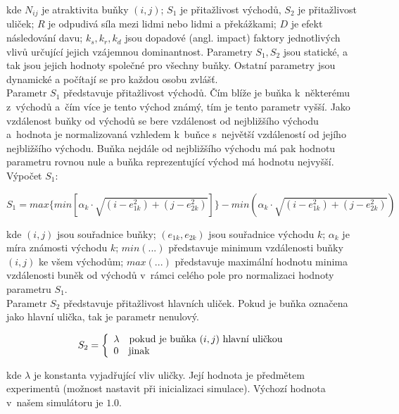 \documentclass[11pt, titlepage, a4paper]{article}
\begin{document}
        kde $N_{ij}$ je atraktivita buňky $(i,j)$; $S_1$ je přitažlivost východů, $S_2$ je přitažlivost uliček; $R$ je odpudivá síla mezi lidmi nebo lidmi a překážkami; $D$ je efekt následování davu; $k_s, k_r, k_d$ jsou dopadové (angl. impact) faktory jednotlivých vlivů určující jejich vzájemnou dominantnost. Parametry $S_1, S_2$ jsou statické, a tak jsou jejich hodnoty společné pro všechny buňky. Ostatní parametry jsou dynamické a počítají se pro každou osobu zvlášť.\\

        Parametr $S_1$ představuje přitažlivost východů. Čím blíže je buňka k~některému z~východů a~čím více je tento východ známý, tím je tento parametr vyšší. Jako vzdálenost buňky od východů se bere vzdálenost od nejbližšího východu a~hodnota je normalizovaná vzhledem k~buňce s~největší vzdáleností od jejího nejbližšího východu. Buňka nejdále od nejbližšího východu má pak hodnotu parametru rovnou nule a buňka reprezentující východ má hodnotu nejvyšší. Výpočet $S_1$:

        \begin{equation}
        \label{eq_S1}
        S_1 = max\{min[\alpha_k \cdot \sqrt{ (i - e_{1k}^2) + (j - e_{2k}^2) }]\} - min(\alpha_k \cdot \sqrt{ (i - e_{1k}^2) + (j - e_{2k}^2)})
        \end{equation}


        kde $(i,j)$ jsou souřadnice buňky; $(e_{1k}, e_{2k})$ jsou souřadnice východu $k$; $\alpha_k$ je míra známosti východu $k$; $min(...)$ představuje minimum vzdálenosti buňky $(i,j)$ ke všem východům; $max(...)$ představuje maximální hodnotu minima vzdálenosti buněk od východů v~rámci celého pole pro normalizaci hodnoty parametru $S_1$.\\

        Parametr $S_2$ představuje přitažlivost hlavních uliček. Pokud je buňka označena jako hlavní ulička, tak je parametr nenulový.

        \begin{equation}
        \label{eq_S2}
        S_2 = \left\{
        \begin{array}{l}
            \lambda \textrm{\quad pokud je buňka $(i,j)$ hlavní uličkou}\\
            0 \textrm{\quad jinak}\\
        \end{array} 
        \right.
        \end{equation}

        kde $\lambda$ je konstanta vyjadřující vliv uličky. Její hodnota je předmětem experimentů (možnost nastavit při inicializaci simulace). Výchozí hodnota v~našem simulátoru je $1.0$.\\
\end{document}
